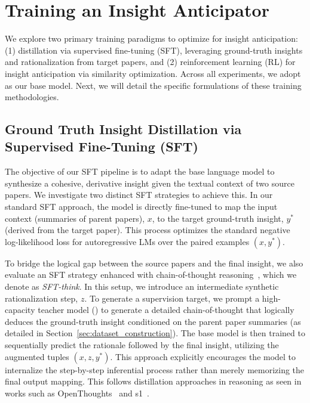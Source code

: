 \section{Training an Insight Anticipator}
We explore two primary training paradigms to optimize \ourmethod{} for insight anticipation: (1) distillation via supervised fine-tuning (SFT), leveraging ground-truth insights and rationalization from target papers, and (2) reinforcement learning (RL) for insight anticipation via similarity optimization. Across all experiments, we adopt \qwenfourb{} as our base model. Next, we will detail the specific formulations of these training methodologies.

\subsection{Ground Truth Insight Distillation via Supervised Fine-Tuning (SFT)}
The objective of our SFT pipeline is to adapt the base language model to synthesize a cohesive, derivative insight given the textual context of two source papers. We investigate two distinct SFT strategies to achieve this. In our standard SFT approach, the model is directly fine-tuned to map the input context (summaries of parent papers), $x$, to the target ground-truth insight, $y^*$ (derived from the target paper). This process optimizes the standard negative log-likelihood loss for autoregressive LMs over the paired examples $(x, y^*)$.

To bridge the logical gap between the source papers and the final insight, we also evaluate an SFT strategy enhanced with chain-of-thought reasoning~\citep{wei2023chainofthoughtpromptingelicitsreasoning}, which we denote as \emph{SFT-think}. In this setup, we introduce an intermediate synthetic rationalization step, $z$. To generate a supervision target, we prompt a high-capacity teacher model (\gemthreepro{}) to generate a detailed chain-of-thought that logically deduces the ground-truth insight conditioned on the parent paper summaries (as detailed in Section~\ref{sec:dataset_construction}). The base model is then trained to sequentially predict the rationale followed by the final insight, utilizing the augmented tuples $(x, z, y^*)$. This approach explicitly encourages the model to internalize the step-by-step inferential process rather than merely memorizing the final output mapping. This follows distillation approaches in reasoning as seen in works such as OpenThoughts~\citep{guha2025openthoughtsdatarecipesreasoning} and s1~\citep{muennighoff2025s1simpletesttimescaling}.

